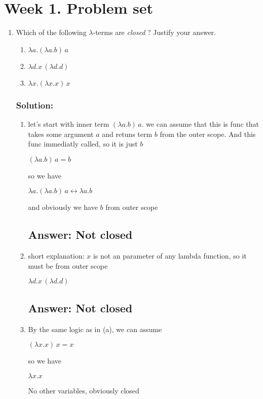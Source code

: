 \documentclass{article}
\begin{document}
\section*{Week 1. Problem set}

\begin{enumerate}
    \item Which of the following $\lambda$-terms are \emph{closed} \cite[§5.1]{1}? Justify your answer.
    \begin{enumerate}
        \item $\lambda a.(\lambda a.b) \, a$
        \item $\lambda d.x \, (\lambda d.d)$
        \item $\lambda x.(\lambda x.x) \, x$
    \end{enumerate}

    \subsubsection*{Solution:}
    \begin{enumerate}
        \item let's start with inner term $(\lambda a.b) \, a$. we can assume that this is func that takes some 
        argument $a$ and retuns term $b$ from the outer scope. And this func immediatly called, so it is just $b$
        \begin{center}
            $(\lambda a.b) \, a = b$
        \end{center}
        so we have
        \begin{center}
            $\lambda a.(\lambda a.b) \, a \leftrightarrow \lambda a.b$
        \end{center}
        and obviously we have $b$ from outer scope
        \subsection*{Answer: Not closed}
        \item short explanation: $x$ is not an parameter of any lambda function, so it must be
        from outer scope
        \begin{center}
            $\lambda d.x \, (\lambda d.d)$
        \end{center}
        \subsection*{Answer: Not closed}
        \item By the same logic as in (a), we can assume
        \begin{center}
            $(\lambda x.x) \, x = x$
        \end{center} 
        so we have
        \begin{center}
            $\lambda x. x$
        \end{center} 
        No other variables, obviously closed

\end{enumerate}
\end{enumerate}
\end{document}
